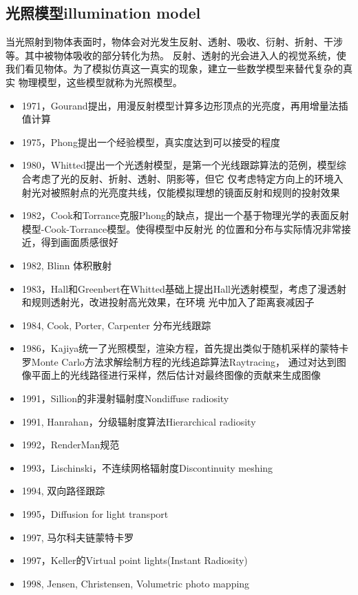 \subsection{光照模型illumination model}
当光照射到物体表面时，物体会对光发生反射、透射、吸收、衍射、折射、干涉等。其中被物体吸收的部分转化为热。
反射、透射的光会进入人的视觉系统，使我们看见物体。为了模拟仿真这一真实的现象，建立一些数学模型来替代复杂的真实
物理模型，这些模型就称为光照模型。
\begin{itemize}
    \item {1971，Gourand提出，用漫反射模型计算多边形顶点的光亮度，再用增量法插值计算}
    \item {1975，Phong提出一个经验模型，真实度达到可以接受的程度}
    \item {1980，Whitted提出一个光透射模型，是第一个光线跟踪算法的范例，模型综合考虑了光的反射、折射、透射、阴影等，但它
    仅考虑特定方向上的环境入射光对被照射点的光亮度共线，仅能模拟理想的镜面反射和规则的投射效果}
    \item {1982，Cook和Torrance克服Phong的缺点，提出一个基于物理光学的表面反射模型-Cook-Torrance模型。使得模型中反射光
    的位置和分布与实际情况非常接近，得到画面质感很好}
    \item {1982, Blinn 体积散射}
    \item {1983，Hall和Greenbert在Whitted基础上提出Hall光透射模型，考虑了漫透射和规则透射光，改进投射高光效果，在环境
    光中加入了距离衰减因子}
    \item {1984, Cook, Porter, Carpenter 分布光线跟踪}
    \item {1986，Kajiya统一了光照模型，渲染方程，首先提出类似于随机采样的蒙特卡罗Monte Carlo方法求解绘制方程的光线追踪算法Raytracing，
    通过对达到图像平面上的光线路径进行采样，然后估计对最终图像的贡献来生成图像}
    \item {1991，Sillion的非漫射辐射度Nondiffuse radiosity}
    \item {1991, Hanrahan，分级辐射度算法Hierarchical radiosity}
    \item {1992，RenderMan规范}
    \item {1993，Lischinski，不连续网格辐射度Discontinuity meshing}
    \item {1994, 双向路径跟踪}
    \item {1995，Diffusion for light transport}
    \item {1997, 马尔科夫链蒙特卡罗}
    \item {1997，Keller的Virtual point lights(Instant Radiosity)}
    \item {1998, Jensen, Christensen, Volumetric photo mapping}

\end{itemize}
